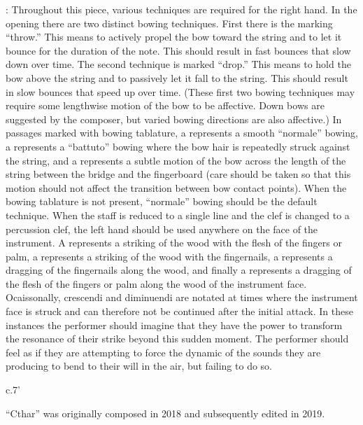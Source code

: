 \documentclass[10pt]{article}
\newcommand*\circled[1]{\tikz[baseline=(char.base)]{
            \node[shape=circle,draw,inner sep=1pt] (char) {#1};}}
\begin{document}
\begingroup
\begin{center}
: Throughout this piece, various techniques are required for the right hand. In the opening there are two distinct bowing techniques. \circled{1} First there is the marking ``throw.'' This means to actively propel the bow toward the string and to let it bounce for the duration of the note. This should result in fast bounces that slow down over time. \circled{2} The second technique is marked ``drop.'' This means to hold the bow above the string and to passively let it fall to the string. This should result in slow bounces that speed up over time. (These first two bowing techniques may require some lengthwise motion of the bow to be affective. Down bows are suggested by the composer, but varied bowing directions are also affective.) \circled{3} In passages marked with bowing tablature, a  represents a smooth ``normale'' bowing, a  represents a ``battuto'' bowing where the bow hair is repeatedly struck against the string, and a  represents a subtle motion of the bow across the length of the string between the bridge and the fingerboard (care should be taken so that this motion should not affect the transition between bow contact points). When the bowing tablature is not present, ``normale'' bowing should be the default technique. \circled{4} When the staff is reduced to a single line and the clef is changed to a percussion clef, the left hand should be used anywhere on the face of the instrument. A  represents a striking of the wood with the flesh of the fingers or palm, a  represents a striking of the wood with the fingernails, a  represents a dragging of the fingernails along the wood, and finally a  represents a dragging of the flesh of the fingers or palm along the wood of the instrument face. Ocaissonally,  crescendi and diminuendi are notated at times where the instrument face is struck and can therefore not be continued after the initial attack. In these instances the performer should imagine that they have the power to transform the resonance of their strike beyond this sudden moment. The performer should feel as if they are attempting to force the dynamic of the sounds they are producing to bend to their will in the air, but failing to do so.
\rightskip\leftskip
\phantom{text} \hfill \phantom{()}
\end{center}
\endgroup

\vspace*{5\baselineskip}

\begin{center}
c.7'
\end{center}

\vspace*{5\baselineskip}

\begin{center}
``Cthar'' was originally composed in 2018 and subsequently edited in 2019.
\end{center}

\vspace*{15\baselineskip}
\end{document}
